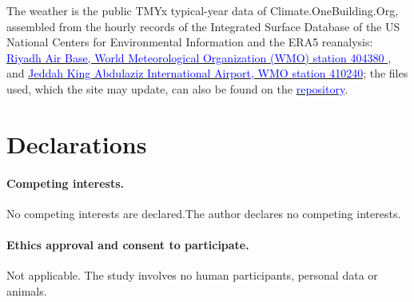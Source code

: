 \documentclass[10pt,a4paper,twocolumn]{article}
\theoremstyle{definition}
\begin{document}
The weather is the public TMYx typical-year data of Climate.OneBuilding.Org, assembled from the hourly records of the Integrated Surface Database of the US National Centers for Environmental Information and the ERA5 reanalysis:
\href{https://climate.onebuilding.org/WMO_Region_2_Asia/SAU_Saudi_Arabia/RI_Riyadh/SAU_RI_Riyadh.AB.404380_TMYx.zip}{\textcolor{blue}{Riyadh Air Base, World Meteorological Organization (WMO) station 404380 }}, and  
\href{https://climate.onebuilding.org/WMO_Region_2_Asia/SAU_Saudi_Arabia/MK_Makkah/SAU_MK_Jeddah-Abdulaziz.Intl.AP.410240_TMYx.zip}{\textcolor{blue}{Jeddah King Abdulaziz International Airport, WMO station 410240}}; the files used, which the site may update, can also be found on the \href{https://github.com/drhamzahfaraj/Comparing-HVAC-Energy-Saving-Measures-in-a-Saudi-Residential-Building-under-a-Volume-Tarif}{\textcolor{blue}{repository}}. 

\section*{Declarations}

\paragraph{Competing interests.} \ifnum{} No competing interests are declared.\else The author declares no competing interests.\fi

\paragraph{Ethics approval and consent to participate.} Not applicable. The study involves no human participants, personal data or animals.


\ifnum{} \else \fi
\end{document}
